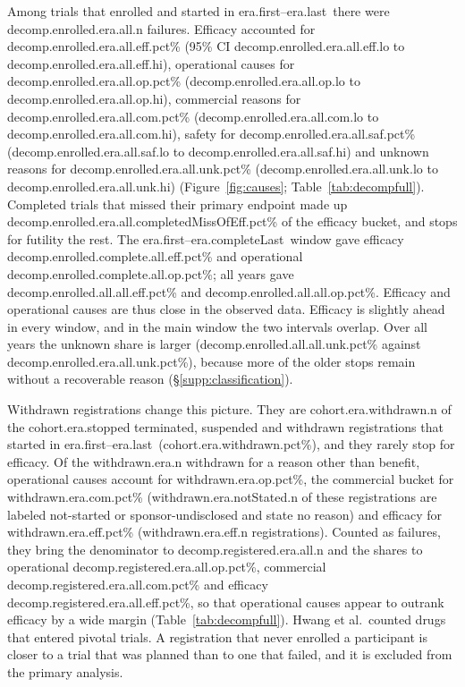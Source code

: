 \documentclass[11pt]{article}
\newcommand{\era}{\num{era.first}--\num{era.last}}
\newcommand{\eracomplete}{\num{era.first}--\num{era.completeLast}}
\begin{document}
Among trials that enrolled and started in \era\ there were \num{decomp.enrolled.era.all.n} failures. Efficacy accounted for \num{decomp.enrolled.era.all.eff.pct}\% (95\% CI \num{decomp.enrolled.era.all.eff.lo} to \num{decomp.enrolled.era.all.eff.hi}), operational causes for \num{decomp.enrolled.era.all.op.pct}\% (\num{decomp.enrolled.era.all.op.lo} to \num{decomp.enrolled.era.all.op.hi}), commercial reasons for \num{decomp.enrolled.era.all.com.pct}\% (\num{decomp.enrolled.era.all.com.lo} to \num{decomp.enrolled.era.all.com.hi}), safety for \num{decomp.enrolled.era.all.saf.pct}\% (\num{decomp.enrolled.era.all.saf.lo} to \num{decomp.enrolled.era.all.saf.hi}) and unknown reasons for \num{decomp.enrolled.era.all.unk.pct}\% (\num{decomp.enrolled.era.all.unk.lo} to \num{decomp.enrolled.era.all.unk.hi}) (Figure~\ref{fig:causes}; Table~\ref{tab:decompfull}). Completed trials that missed their primary endpoint made up \num{decomp.enrolled.era.all.completedMissOfEff.pct}\% of the efficacy bucket, and stops for futility the rest. The \eracomplete\ window gave efficacy \num{decomp.enrolled.complete.all.eff.pct}\% and operational \num{decomp.enrolled.complete.all.op.pct}\%; all years gave \num{decomp.enrolled.all.all.eff.pct}\% and \num{decomp.enrolled.all.all.op.pct}\%. Efficacy and operational causes are thus close in the observed data. Efficacy is slightly ahead in every window, and in the main window the two intervals overlap. Over all years the unknown share is larger (\num{decomp.enrolled.all.all.unk.pct}\% against \num{decomp.enrolled.era.all.unk.pct}\%), because more of the older stops remain without a recoverable reason (\S\ref{supp:classification}).

Withdrawn registrations change this picture. They are \num{cohort.era.withdrawn.n} of the \num{cohort.era.stopped} terminated, suspended and withdrawn registrations that started in \era\ (\num{cohort.era.withdrawn.pct}\%), and they rarely stop for efficacy. Of the \num{withdrawn.era.n} withdrawn for a reason other than benefit, operational causes account for \num{withdrawn.era.op.pct}\%, the commercial bucket for \num{withdrawn.era.com.pct}\% (\num{withdrawn.era.notStated.n} of these registrations are labeled not-started or sponsor-undisclosed and state no reason) and efficacy for \num{withdrawn.era.eff.pct}\% (\num{withdrawn.era.eff.n} registrations). Counted as failures, they bring the denominator to \num{decomp.registered.era.all.n} and the shares to operational \num{decomp.registered.era.all.op.pct}\%, commercial \num{decomp.registered.era.all.com.pct}\% and efficacy \num{decomp.registered.era.all.eff.pct}\%, so that operational causes appear to outrank efficacy by a wide margin (Table~\ref{tab:decompfull}). Hwang et al.\ counted drugs that entered pivotal trials. A registration that never enrolled a participant is closer to a trial that was planned than to one that failed, and it is excluded from the primary analysis.
\end{document}
